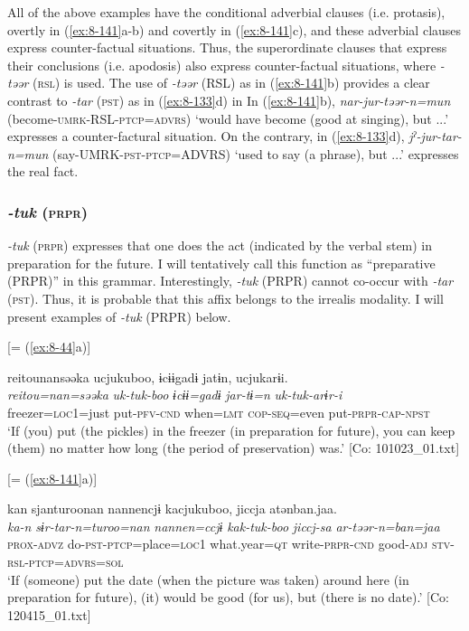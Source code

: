 All of the above examples have the conditional adverbial clauses (i.e. protasis), overtly in (\ref{ex:8-141}a-b) and covertly in (\ref{ex:8-141}c), and these adverbial clauses express counter-factual situations. Thus, the superordinate clauses that express their conclusions (i.e. apodosis) also express counter-factual situations, where \textit{-təər} (\textsc{rsl}) is used. The use of \textit{-təər} (RSL) as in (\ref{ex:8-141}b) provides a clear contrast to \textit{-tar} (\textsc{pst}) as in (\ref{ex:8-133}d) in  In (\ref{ex:8-141}b), \textit{nar-jur-təər-n=mun} (become-\textsc{umrk}-RSL-\textsc{ptcp}=\textsc{advrs}) ‘would have become (good at singing), but ...’ expresses a counter-factural situation. On the contrary, in (\ref{ex:8-133}d), \textit{jˀ-jur-tar-n=mun} (say-UMRK-\textsc{pst}-\textsc{ptcp}=ADVRS) ‘used to say (a phrase), but ...’ expresses the real fact.

\subsubsection{\textit{-tuk} (\textsc{prpr})}

\textit{-tuk} (\textsc{prpr}) expresses that one does the act (indicated by the verbal stem) in preparation for the future. I will tentatively call this function as “preparative (PRPR)” in this grammar. Interestingly, \textit{-tuk} (PRPR) cannot co-occur with \textit{-tar} (\textsc{pst}). Thus, it is probable that this affix belongs to the irrealis modality. I will present examples of \textit{-tuk} (PRPR) below.

\ea\label{ex:8-142}
\ea {}[= (\ref{ex:8-44}a)]

{\TM}
\glll  {\textbar}reitou{\textbar}nansəəka  ucjukuboo,  ɨcɨɨgadɨ  jatɨn,      ucjukarɨi.\\
\textit{reitou=nan=səəka}  \textit{uk-tuk-boo}  \textit{ɨcɨɨ=gadɨ}  \textit{jar-tɨ=n}      \textit{uk-tuk-arɨr-i}
\\
freezer=\textsc{loc1}=just  put-\textsc{pfv}-\textsc{cnd}  when=\textsc{lmt}  \textsc{cop}-\textsc{seq}=even  put-\textsc{prpr}-\textsc{cap}-\textsc{npst}\\
\glt ‘If (you) put (the pickles) in the freezer (in preparation for future), you can keep (them) no matter how long (the period of preservation) was.’ [Co: 101023\_01.txt]

\ex{} [= (\ref{ex:8-141}a)]

{\TM}
\glll  kan  sjanturoonan  {\textbar}nannen{\textbar}cjɨ  kacjukuboo,     jiccja  atənban.jaa.  \\
\textit{ka-n}  \textit{sɨr-tar-n=turoo=nan}  \textit{nannen=ccjɨ}  \textit{kak-tuk-boo}      \textit{jiccj-sa}  \textit{ar-təər-n=ban=jaa}  \\
\textsc{prox}-\textsc{advz}  do-\textsc{pst}-\textsc{ptcp}=place=\textsc{loc1}  what.year=\textsc{qt}  write-\textsc{prpr}-\textsc{cnd}  good-\textsc{adj}  \textsc{stv}-\textsc{rsl}-\textsc{ptcp}=\textsc{advrs}=\textsc{sol}\\
\glt ‘If (someone) put the date (when the picture was taken) around here (in preparation for future), (it) would be good (for us), but (there is no date).’ [Co: 120415\_01.txt]

